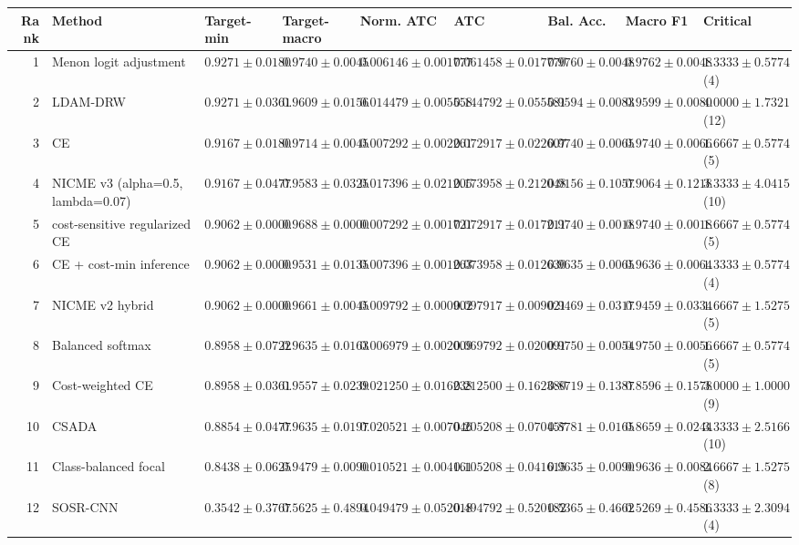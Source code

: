 \begin{tabular}{rllllllll}
\toprule
Rank & Method & Target-min & Target-macro & Norm. ATC & ATC & Bal. Acc. & Macro F1 & Critical \\
\midrule
1 & Menon logit adjustment & $0.9271 \pm 0.0180$ & $0.9740 \pm 0.0045$ & $0.006146 \pm 0.001777$ & $0.061458 \pm 0.017770$ & $0.9760 \pm 0.0048$ & $0.9762 \pm 0.0048$ & $1.3333 \pm 0.5774$ (4) \\
2 & LDAM-DRW & $0.9271 \pm 0.0361$ & $0.9609 \pm 0.0156$ & $0.014479 \pm 0.005558$ & $0.144792 \pm 0.055581$ & $0.9594 \pm 0.0083$ & $0.9599 \pm 0.0080$ & $4.0000 \pm 1.7321$ (12) \\
3 & CE & $0.9167 \pm 0.0180$ & $0.9714 \pm 0.0045$ & $0.007292 \pm 0.002261$ & $0.072917 \pm 0.022607$ & $0.9740 \pm 0.0065$ & $0.9740 \pm 0.0066$ & $1.6667 \pm 0.5774$ (5) \\
4 & NICME v3 (alpha=0.5, lambda=0.07) & $0.9167 \pm 0.0477$ & $0.9583 \pm 0.0325$ & $0.017396 \pm 0.021205$ & $0.173958 \pm 0.212048$ & $0.9156 \pm 0.1057$ & $0.9064 \pm 0.1218$ & $3.3333 \pm 4.0415$ (10) \\
5 & cost-sensitive regularized CE & $0.9062 \pm 0.0000$ & $0.9688 \pm 0.0000$ & $0.007292 \pm 0.001721$ & $0.072917 \pm 0.017211$ & $0.9740 \pm 0.0018$ & $0.9740 \pm 0.0018$ & $1.6667 \pm 0.5774$ (5) \\
6 & CE + cost-min inference & $0.9062 \pm 0.0000$ & $0.9531 \pm 0.0135$ & $0.007396 \pm 0.001263$ & $0.073958 \pm 0.012630$ & $0.9635 \pm 0.0065$ & $0.9636 \pm 0.0064$ & $1.3333 \pm 0.5774$ (4) \\
7 & NICME v2 hybrid & $0.9062 \pm 0.0000$ & $0.9661 \pm 0.0045$ & $0.009792 \pm 0.000902$ & $0.097917 \pm 0.009021$ & $0.9469 \pm 0.0317$ & $0.9459 \pm 0.0334$ & $1.6667 \pm 1.5275$ (5) \\
8 & Balanced softmax & $0.8958 \pm 0.0722$ & $0.9635 \pm 0.0163$ & $0.006979 \pm 0.002009$ & $0.069792 \pm 0.020091$ & $0.9750 \pm 0.0054$ & $0.9750 \pm 0.0056$ & $1.6667 \pm 0.5774$ (5) \\
9 & Cost-weighted CE & $0.8958 \pm 0.0361$ & $0.9557 \pm 0.0239$ & $0.021250 \pm 0.016238$ & $0.212500 \pm 0.162380$ & $0.8719 \pm 0.1387$ & $0.8596 \pm 0.1578$ & $3.0000 \pm 1.0000$ (9) \\
10 & CSADA & $0.8854 \pm 0.0477$ & $0.9635 \pm 0.0197$ & $0.020521 \pm 0.007046$ & $0.205208 \pm 0.070457$ & $0.8781 \pm 0.0165$ & $0.8659 \pm 0.0244$ & $3.3333 \pm 2.5166$ (10) \\
11 & Class-balanced focal & $0.8438 \pm 0.0625$ & $0.9479 \pm 0.0090$ & $0.010521 \pm 0.004161$ & $0.105208 \pm 0.041615$ & $0.9635 \pm 0.0090$ & $0.9636 \pm 0.0084$ & $2.6667 \pm 1.5275$ (8) \\
12 & SOSR-CNN & $0.3542 \pm 0.3767$ & $0.5625 \pm 0.4894$ & $0.049479 \pm 0.052018$ & $0.494792 \pm 0.520182$ & $0.5365 \pm 0.4662$ & $0.5269 \pm 0.4586$ & $1.3333 \pm 2.3094$ (4) \\
\bottomrule
\end{tabular}
